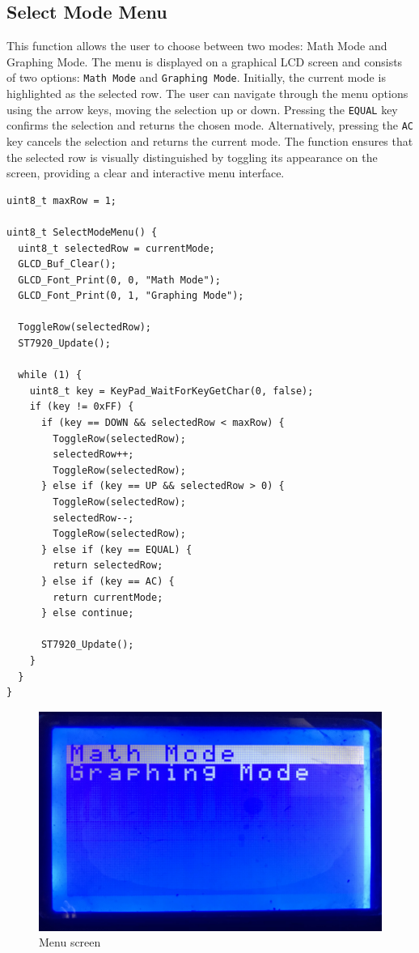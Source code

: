 \documentclass[a4paper, twoside]{report}
\begin{document}
\subsection{Select Mode Menu}
This function allows the user to choose between two modes: Math Mode and Graphing Mode. The menu is displayed on a graphical LCD screen and consists of two options: \texttt{Math Mode} and \texttt{Graphing Mode}. Initially, the current mode is highlighted as the selected row. The user can navigate through the menu options using the arrow keys, moving the selection up or down. Pressing the \texttt{EQUAL} key confirms the selection and returns the chosen mode. Alternatively, pressing the \texttt{AC} key cancels the selection and returns the current mode. The function ensures that the selected row is visually distinguished by toggling its appearance on the screen, providing a clear and interactive menu interface.
\begin{verbatim}
uint8_t maxRow = 1;

uint8_t SelectModeMenu() {
  uint8_t selectedRow = currentMode;
  GLCD_Buf_Clear();
  GLCD_Font_Print(0, 0, "Math Mode");
  GLCD_Font_Print(0, 1, "Graphing Mode");

  ToggleRow(selectedRow);
  ST7920_Update();

  while (1) {
    uint8_t key = KeyPad_WaitForKeyGetChar(0, false);
    if (key != 0xFF) {
      if (key == DOWN && selectedRow < maxRow) {
        ToggleRow(selectedRow);
        selectedRow++;
        ToggleRow(selectedRow);
      } else if (key == UP && selectedRow > 0) {
        ToggleRow(selectedRow);
        selectedRow--;
        ToggleRow(selectedRow);
      } else if (key == EQUAL) {
        return selectedRow;
      } else if (key == AC) {
        return currentMode;
      } else continue;

      ST7920_Update();
    }
  }
}
\end{verbatim}
\begin{figure}[H]
    \centering
    \includegraphics[width=.7\textwidth]{LCDScreens/menu.jpeg}
    \caption{Menu screen}
\end{figure}
\end{document}
